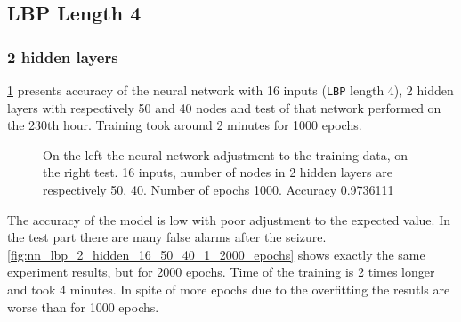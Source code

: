 \subsection{LBP Length 4}
\subsubsection{2 hidden layers}
\figurename{} \ref{fig:nn_lbp_2_hidden_16_50_40_1_1000_epochs} presents accuracy of the neural network with 16 inputs (\verb|LBP| length 4), 2 hidden layers with respectively 50 and 40 nodes and test of that network performed on the 230th hour. Training took around 2 minutes for 1000 epochs. 

\begin{figure}[H]
	\begin{center}
	\end{center}
	\caption{On the left the neural network adjustment to the training data, on the right test. 16 inputs, number of nodes in 2 hidden layers are respectively 50, 40. Number of epochs 1000. Accuracy \num{0.9736111}}

	\label{fig:nn_lbp_2_hidden_16_50_40_1_1000_epochs}
\end{figure}
The accuracy of the model is low with poor adjustment to the expected value. In the test part there are many false alarms after the seizure. \figurename{} \ref{fig:nn_lbp_2_hidden_16_50_40_1_2000_epochs} shows exactly the same experiment results, but for 2000 epochs. Time of the training is 2 times longer and took 4 minutes. In spite of more epochs due to the overfitting the resutls are worse than for 1000 epochs.

